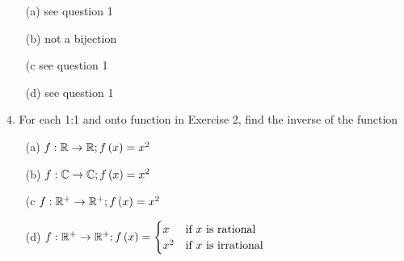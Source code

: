 \begin{mdframed}[style=darkAnswer,frametitle={Joe Starr}]
  \begin{multicols}{2}
    \begin{itemize}
      \item [(a)]{
            see question 1
            }
      \item [(b)]{
            not a bijection
            }
      \item [(c]{
            see question 1
            }
      \item [(d)]{
            see question 1
            }
    \end{itemize}
  \end{multicols}
\end{mdframed}
\newpage
\begin{mdframed}[style=darkQuesion]
  4.   For each 1:1 and onto function in Exercise 2, find the inverse of the
  function
  \begin{itemize}
    \item [(a)]{
          $f:\mathbb{R}\to \mathbb{R}; f\left(x\right)=x^2$
          }
    \item [(b)]{
          $f:\mathbb{C}\to \mathbb{C}; f\left(x\right)=x^2$
          }
    \item [(c]{
          $f:\mathbb{R}^+\to \mathbb{R}^+; f\left(x\right)=x^2$
          }
    \item [(d)]{
          $f:\mathbb{R}^+\to \mathbb{R}^+; f\left(x\right)=
            \begin{cases}
              x   & \text{if }x\text{ is rational}   \\
              x^2 & \text{if }x\text{ is irrational} \\
            \end{cases}$
          }
  \end{itemize}
\end{mdframed}

